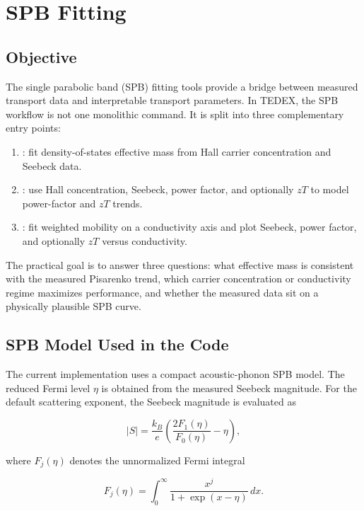 \chapter{SPB Fitting}

\section{Objective}

The single parabolic band (SPB) fitting tools provide a bridge between measured
transport data and interpretable transport parameters. In TEDEX, the SPB
workflow is not one monolithic command. It is split into three complementary
entry points:

\begin{enumerate}[leftmargin=*]
  \item {}: fit density-of-states effective mass from
  Hall carrier concentration and Seebeck data.
  \item {}: use Hall concentration, Seebeck, power
  factor, and optionally $zT$ to model power-factor and $zT$ trends.
  \item {}: fit weighted mobility on a conductivity
  axis and plot Seebeck, power factor, and optionally $zT$ versus conductivity.
\end{enumerate}

The practical goal is to answer three questions: what effective mass is
consistent with the measured Pisarenko trend, which carrier concentration or
conductivity regime maximizes performance, and whether the measured data sit on
a physically plausible SPB curve.

\section{SPB Model Used in the Code}

The current implementation uses a compact acoustic-phonon SPB model. The
reduced Fermi level $\eta$ is obtained from the measured Seebeck magnitude. For
the default scattering exponent, the Seebeck magnitude is evaluated as

\begin{equation}
  |S| = \frac{k_B}{e}
  \left( \frac{2F_1(\eta)}{F_0(\eta)} - \eta \right),
\end{equation}

where $F_j(\eta)$ denotes the unnormalized Fermi integral

\begin{equation}
  F_j(\eta) = \int_0^\infty
  \frac{x^j}{1 + \exp(x-\eta)}\,dx.
\end{equation}

